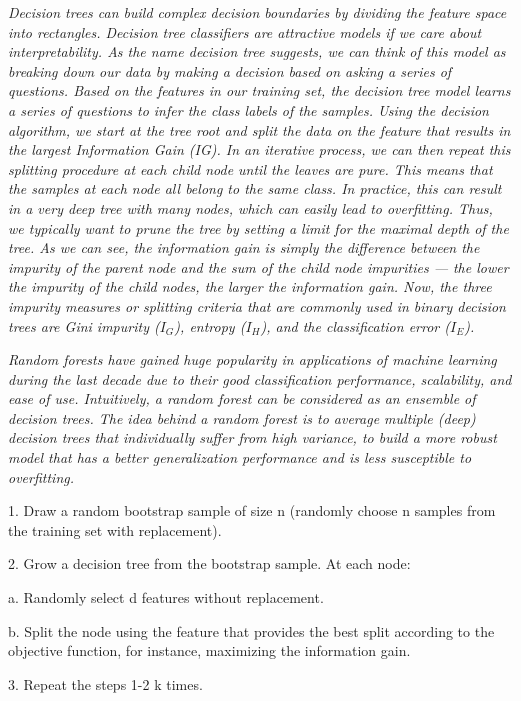 \textit{Decision trees can build complex decision boundaries by dividing the feature space into rectangles. Decision tree classifiers are attractive models if we care about interpretability. As the name decision tree suggests, we can think of this model as breaking down our data by making a decision based on asking a series of questions. Based on the features in our training set, the decision tree model learns a series of questions to infer the class labels of the samples. Using the decision algorithm, we start at the tree root and split the data on the feature that results in the largest Information Gain (IG). In an iterative process, we can then repeat this splitting procedure at each child node until the leaves are pure. This means that the samples at each node all belong to the same class. In practice, this can result in a very deep tree with many nodes, which can easily lead to overfitting. Thus, we typically want to prune the tree by setting a limit for the maximal depth of the tree. As we can see, the information gain is simply the difference between the impurity of the parent node and the sum of the child node impurities — the lower the impurity of the child nodes, the larger the information gain. Now, the three impurity measures or splitting criteria that are commonly used in binary decision trees are Gini impurity ($I_G$), entropy ($I_H$), and the classification error ($I_E$).}

\textit{Random forests have gained huge popularity in applications of machine learning during the last decade due to their good classification performance, scalability, and ease of use. Intuitively, a random forest can be considered as an ensemble of decision trees. The idea behind a random forest is to average multiple (deep) decision trees that individually suffer from high variance, to build a more robust model that has a better generalization performance and is less susceptible to overfitting.}

1. Draw a random bootstrap sample of size n (randomly choose n samples from the training set with replacement).

2. Grow a decision tree from the bootstrap sample. At each node:

a. Randomly select d features without replacement.

b. Split the node using the feature that provides the best split according to the objective function, for instance, maximizing the information gain.

3. Repeat the steps 1-2 k times.

